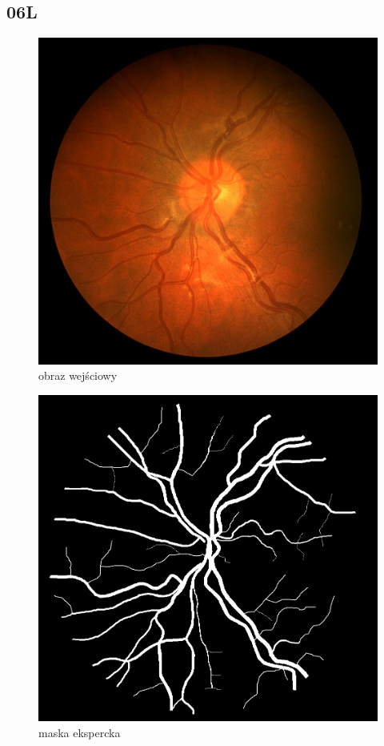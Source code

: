 \documentclass[polish,polish,a4paper]{article}
\begin{document}






		\subsection{06L}

\begin{figure}[!h]
	\centering
	\begin{minipage}{0.26\linewidth}
		\includegraphics[width=\linewidth]{../chase/Image_06L.jpg}
		\centering
			\small{obraz wejściowy}
	\end{minipage}
	\hfill
	\begin{minipage}{0.26\linewidth}
		\includegraphics[width=\linewidth]{../chase/Image_06L_1stHO.png}
		\centering
			\small{maska ekspercka}
	\end{minipage}
\end{figure}
\end{document}
